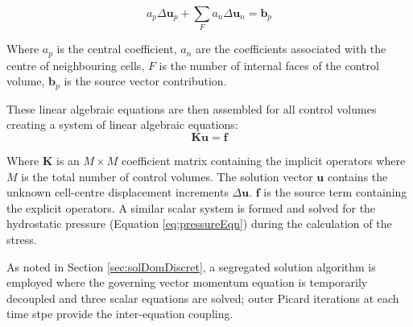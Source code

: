 \documentclass[sn-mathphys,Numbered,draft]{sn-jnl}%
\begin{document}
\begin{equation}
a_p \Delta \mathbf{u}_p+\sum_F a_n \Delta \mathbf{u}_n=\mathbf{b}_p
\end{equation}

Where $a_{p}$ is the central coefficient, $a_{n}$ are the coefficients associated with the centre of neighbouring cells, $F$ is the number of internal faces of the control volume,  $\mathbf{b}_p$ is the source vector contribution.

These linear algebraic equations are then assembled for all control volumes creating a system of linear algebraic equations:
\begin{equation}
    \mathbf{K}\mathbf{u}=\mathbf{f}
\end{equation}

Where $\mathbf{K}$ is an $M \times M$ coefficient matrix containing the implicit operators where $M$ is the total number of control volumes. The solution vector $\mathbf{u}$ contains the unknown cell-centre displacement increments $\Delta\mathbf{ u}$. $\mathbf{f}$ is the source term containing the explicit operators.
A similar scalar system is formed and solved for the hydrostatic pressure (Equation \ref{eq:pressureEqn}) during the calculation of the stress.

As noted in Section \ref{sec:solDomDiscret}, a segregated solution algorithm is employed where the governing vector momentum equation is temporarily decoupled and three scalar equations are solved; outer Picard iterations at each time stpe provide the inter-equation coupling.
\end{document}
